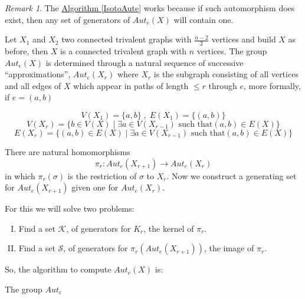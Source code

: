 \documentclass[12pt,a4paper]{book}
\theoremstyle{plain}
\theoremstyle{definition}
\theoremstyle{remark}
\newtheorem{obs}{Remark}
\begin{document}
\begin{obs}
 The \hyperlink{IsotoAute}{Algorithm \ref{IsotoAute}} works because if such automorphism  does exist, then any set of generators of $Aut_e(X)$ will contain one.
\end{obs}

Let $X_1$ and $X_2$ two connected trivalent graphs with $\frac{n-2}{2}$ vertices and build $X$ as before, then $X$ is a connected trivalent graph 
with $n$ vertices. The group $Aut_e(X)$ is determined through a natural sequence of successive ``approximations'', $Aut_e(X_r)$ where $X_r$ is the 
subgraph consisting of all vertices and all edges of $X$ which appear in paths of length $\leq r$ through $e$, more formally, if $e= (a,b)$

\[V(X_1) = \{ a,b \} \; , \; E(X_1) = \{ (a,b) \}\]
\[ V ( X_r) = \{ b \in V( X) \; | \; \exists a \in V(X_{r-1} ) \mbox{ such that} (a,b) \in E(X) \} \]
\[
 E(X_r) =  \{ ( a,b) \in E( X) \; | \; \exists a \in V(X_{r-1} ) \mbox{ such that} (a,b) \in E(X) \}
\]

There are natural homomorphisms
\[
 \pi_r : Aut_e(X_{r+1}) \rightarrow Aut_e(X_r)
\]
in which $\pi_r(\sigma)$ is the restriction of $\sigma$ to $X_r$. Now we construct a generating set for $Aut_e(X_{r+1})$ given one for $Aut_e(X_r)$.

For this we will solve two problems:
\begin{enumerate}[(I)]
 \item Find a set $\mathcal{K}$, of generators for $K_r$, the kernel of $\pi_r$. 
 \item Find a set $\mathcal{S}$, of generators for $\pi_r(Aut_e(X_{r+1}))$, the image of $\pi_r$.
\end{enumerate}

So, the algorithm to compute $Aut_e(X)$ is:

\begin{center}
 
\begin{algorithm}\label{Aute}\hypertarget{Aute}{}
\caption{The group $Aut_e$}

\end{algorithm}
 

\end{center}
\end{document}
